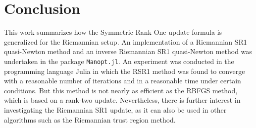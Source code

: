 \chapter{Conclusion}

This work summarizes how the Symmetric Rank-One update formula is generalized for the Riemannian setup. An implementation of a Riemannian SR1 quasi-Newton method and an inverse Riemannian SR1 quasi-Newton method was undertaken in the package \lstinline!Manopt.jl!. An experiment was conducted in the programming language Julia in which the RSR1 method was found to converge with a reasonable number of iterations and in a reasonable time under certain conditions. But this method is not nearly as efficient as the RBFGS method, which is based on a rank-two update. Nevertheless, there is further interest in investigating the Riemannian SR1 update, as it can also be used in other algorithms such as the Riemannian trust region method. 